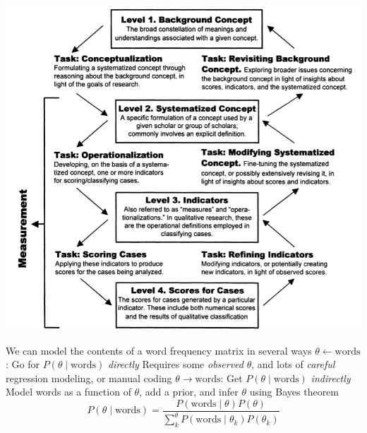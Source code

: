 \documentclass{mediumfoils}
\begin{document}
\centerline{\includegraphics[scale=.45]{pictures/measurement-validity}}

%
%
%
%
%


We can model the contents of a word frequency matrix in several ways
\ita
\itm $\theta \longleftarrow \text{words}$: Go for $P(\theta \mid \text{words})$ \textit{directly}
\ita
\itm Requires some \textit{observed} $\theta$, and lots of \textit{careful} regression modeling, or manual coding
\itz
\itm $\theta \longrightarrow \text{words}$: Get $P(\theta \mid \text{words})$ \textit{indirectly}
\ita
\itm Model words as a function of $\theta$, add a prior, and infer $\theta$ using Bayes theorem
\[
P(\theta \mid \text{words}) = \frac{P(\text{words} \mid \theta)P(\theta)}{\sum^\theta_k P(\text{words} \mid \theta_k)P(\theta_k)}
\]
\itz
\itz 


\end{document}
